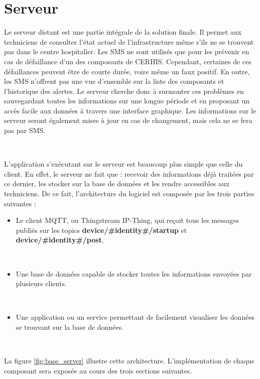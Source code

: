 \section{Serveur}
\label{sec:server}

\noindent
Le serveur distant est une partie intégrale de la solution finale. Il permet aux techniciens de consulter l'état actuel de l'infrastructure même s'ils ne se trouvent pas dans le centre hospitalier. Les SMS ne sont utilisés que pour les prévenir en cas de défaillance d'un des composants de CERHIS. Cependant, certaines de ces défaillances peuvent être de courte durée, voire même un faux positif. En outre, les SMS n'offrent pas une vue d'ensemble sur la liste des composants et l'historique des alertes. Le serveur cherche donc à surmonter ces problèmes en sauvegardant toutes les informations sur une longue période et en proposant un accès facile aux données à travers une interface graphique. Les informations sur le serveur seront également mises à jour en cas de changement, mais cela ne se fera pas par SMS.

~

\noindent
L'application s'exécutant sur le serveur est beaucoup plus simple que celle du client. En effet, le serveur ne fait que : recevoir des informations déjà traitées par ce dernier, les stocker sur la base de données et les rendre accessibles aux techniciens. De ce fait, l'architecture du logiciel est composée par les trois parties suivantes :


\begin{itemize}
  \item Le client MQTT, ou Thingstream IP-Thing, qui reçoit tous les messages publiés sur les topics \textbf{device/\#identity\#/startup} et \textbf{device/\#identity\#/post}.

  ~

  \item Une base de données capable de stocker toutes les informations envoyées par plusieurs clients.

  ~

  \item Une application ou un service permettant de facilement visualiser les données se trouvant sur la base de données.
\end{itemize}

~

\noindent
La figure \ref{fig:base_server} illustre cette architecture. L'implémentation de chaque composant sera exposée au cours des trois sections suivantes.

